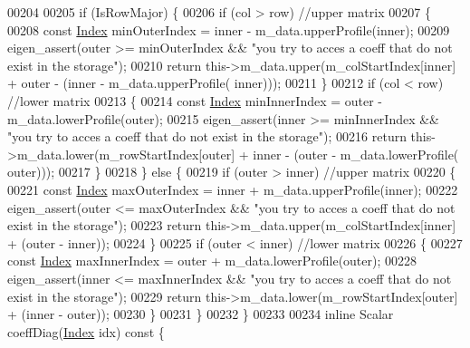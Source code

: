 \begin{DoxyCode}
00204 
00205         \textcolor{keywordflow}{if} (IsRowMajor) \{
00206             \textcolor{keywordflow}{if} (col > row) \textcolor{comment}{//upper matrix}
00207             \{
00208                 \textcolor{keyword}{const} \hyperlink{group___core___module_a554f30542cc2316add4b1ea0a492ff02}{Index} minOuterIndex = inner - m\_data.upperProfile(inner);
00209                 eigen\_assert(outer >= minOuterIndex && \textcolor{stringliteral}{"you try to acces a coeff that do not exist in the
       storage"});
00210                 \textcolor{keywordflow}{return} this->m\_data.upper(m\_colStartIndex[inner] + outer - (inner - m\_data.upperProfile(
      inner)));
00211             \}
00212             \textcolor{keywordflow}{if} (col < row) \textcolor{comment}{//lower matrix}
00213             \{
00214                 \textcolor{keyword}{const} \hyperlink{group___core___module_a554f30542cc2316add4b1ea0a492ff02}{Index} minInnerIndex = outer - m\_data.lowerProfile(outer);
00215                 eigen\_assert(inner >= minInnerIndex && \textcolor{stringliteral}{"you try to acces a coeff that do not exist in the
       storage"});
00216                 \textcolor{keywordflow}{return} this->m\_data.lower(m\_rowStartIndex[outer] + inner - (outer - m\_data.lowerProfile(
      outer)));
00217             \}
00218         \} \textcolor{keywordflow}{else} \{
00219             \textcolor{keywordflow}{if} (outer > inner) \textcolor{comment}{//upper matrix}
00220             \{
00221                 \textcolor{keyword}{const} \hyperlink{group___core___module_a554f30542cc2316add4b1ea0a492ff02}{Index} maxOuterIndex = inner + m\_data.upperProfile(inner);
00222                 eigen\_assert(outer <= maxOuterIndex && \textcolor{stringliteral}{"you try to acces a coeff that do not exist in the
       storage"});
00223                 \textcolor{keywordflow}{return} this->m\_data.upper(m\_colStartIndex[inner] + (outer - inner));
00224             \}
00225             \textcolor{keywordflow}{if} (outer < inner) \textcolor{comment}{//lower matrix}
00226             \{
00227                 \textcolor{keyword}{const} \hyperlink{group___core___module_a554f30542cc2316add4b1ea0a492ff02}{Index} maxInnerIndex = outer + m\_data.lowerProfile(outer);
00228                 eigen\_assert(inner <= maxInnerIndex && \textcolor{stringliteral}{"you try to acces a coeff that do not exist in the
       storage"});
00229                 \textcolor{keywordflow}{return} this->m\_data.lower(m\_rowStartIndex[outer] + (inner - outer));
00230             \}
00231         \}
00232     \}
00233 
00234     \textcolor{keyword}{inline} Scalar coeffDiag(\hyperlink{group___core___module_a554f30542cc2316add4b1ea0a492ff02}{Index} idx)\textcolor{keyword}{ const }\{

\end{DoxyCode}

